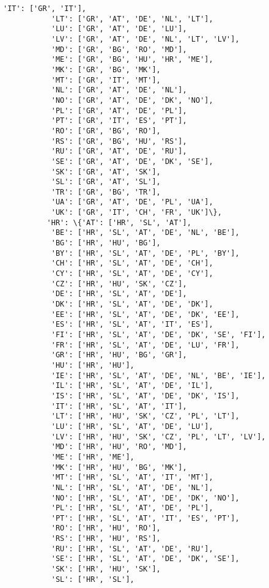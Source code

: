\documentclass[11pt]{article}
\begin{document}
\begin{Verbatim}[commandchars=\\\{\}]
           'IT': ['GR', 'IT'],
           'LT': ['GR', 'AT', 'DE', 'NL', 'LT'],
           'LU': ['GR', 'AT', 'DE', 'LU'],
           'LV': ['GR', 'AT', 'DE', 'NL', 'LT', 'LV'],
           'MD': ['GR', 'BG', 'RO', 'MD'],
           'ME': ['GR', 'BG', 'HU', 'HR', 'ME'],
           'MK': ['GR', 'BG', 'MK'],
           'MT': ['GR', 'IT', 'MT'],
           'NL': ['GR', 'AT', 'DE', 'NL'],
           'NO': ['GR', 'AT', 'DE', 'DK', 'NO'],
           'PL': ['GR', 'AT', 'DE', 'PL'],
           'PT': ['GR', 'IT', 'ES', 'PT'],
           'RO': ['GR', 'BG', 'RO'],
           'RS': ['GR', 'BG', 'HU', 'RS'],
           'RU': ['GR', 'AT', 'DE', 'RU'],
           'SE': ['GR', 'AT', 'DE', 'DK', 'SE'],
           'SK': ['GR', 'AT', 'SK'],
           'SL': ['GR', 'AT', 'SL'],
           'TR': ['GR', 'BG', 'TR'],
           'UA': ['GR', 'AT', 'DE', 'PL', 'UA'],
           'UK': ['GR', 'IT', 'CH', 'FR', 'UK']\},
          'HR': \{'AT': ['HR', 'SL', 'AT'],
           'BE': ['HR', 'SL', 'AT', 'DE', 'NL', 'BE'],
           'BG': ['HR', 'HU', 'BG'],
           'BY': ['HR', 'SL', 'AT', 'DE', 'PL', 'BY'],
           'CH': ['HR', 'SL', 'AT', 'DE', 'CH'],
           'CY': ['HR', 'SL', 'AT', 'DE', 'CY'],
           'CZ': ['HR', 'HU', 'SK', 'CZ'],
           'DE': ['HR', 'SL', 'AT', 'DE'],
           'DK': ['HR', 'SL', 'AT', 'DE', 'DK'],
           'EE': ['HR', 'SL', 'AT', 'DE', 'DK', 'EE'],
           'ES': ['HR', 'SL', 'AT', 'IT', 'ES'],
           'FI': ['HR', 'SL', 'AT', 'DE', 'DK', 'SE', 'FI'],
           'FR': ['HR', 'SL', 'AT', 'DE', 'LU', 'FR'],
           'GR': ['HR', 'HU', 'BG', 'GR'],
           'HU': ['HR', 'HU'],
           'IE': ['HR', 'SL', 'AT', 'DE', 'NL', 'BE', 'IE'],
           'IL': ['HR', 'SL', 'AT', 'DE', 'IL'],
           'IS': ['HR', 'SL', 'AT', 'DE', 'DK', 'IS'],
           'IT': ['HR', 'SL', 'AT', 'IT'],
           'LT': ['HR', 'HU', 'SK', 'CZ', 'PL', 'LT'],
           'LU': ['HR', 'SL', 'AT', 'DE', 'LU'],
           'LV': ['HR', 'HU', 'SK', 'CZ', 'PL', 'LT', 'LV'],
           'MD': ['HR', 'HU', 'RO', 'MD'],
           'ME': ['HR', 'ME'],
           'MK': ['HR', 'HU', 'BG', 'MK'],
           'MT': ['HR', 'SL', 'AT', 'IT', 'MT'],
           'NL': ['HR', 'SL', 'AT', 'DE', 'NL'],
           'NO': ['HR', 'SL', 'AT', 'DE', 'DK', 'NO'],
           'PL': ['HR', 'SL', 'AT', 'DE', 'PL'],
           'PT': ['HR', 'SL', 'AT', 'IT', 'ES', 'PT'],
           'RO': ['HR', 'HU', 'RO'],
           'RS': ['HR', 'HU', 'RS'],
           'RU': ['HR', 'SL', 'AT', 'DE', 'RU'],
           'SE': ['HR', 'SL', 'AT', 'DE', 'DK', 'SE'],
           'SK': ['HR', 'HU', 'SK'],
           'SL': ['HR', 'SL'],

\end{Verbatim}
\end{document}
